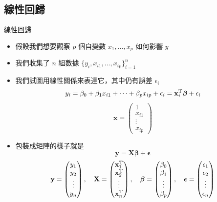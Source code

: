 \documentclass{beamer}
\begin{document}
\begin{CJK}{UTF8}{bsmi}
\subsection{線性回歸}
\begin{frame}[allowframebreaks]{線性回歸}
  \begin{itemize}
    \item 假設我們想要觀察 $p$ 個自變數 $x_1, \dots, x_p$ 如何影響 $y$
    \item 我們收集了 $n$ 組數據 $\{y_i, x_{i1}, \dots, x_{ip}\}_{i=1}^n$
    \item 我們試圖用線性關係來表達它，其中仍有誤差 $\epsilon_i$
      \[y_i = \beta_0 + \beta_1 x_{i1} + \cdots + \beta_p x_{ip} + \epsilon_i
	  = \mathbf x_i^{\textup T} \boldsymbol\beta + \epsilon_i\]
      \[\mathbf x = \begin{pmatrix} 1\\ x_{i1}\\ \vdots\\ x_{ip} \end{pmatrix}\]
    \item 包裝成矩陣的樣子就是
      \[\mathbf y = \mathbf X \boldsymbol\beta + \boldsymbol\epsilon\]
      \[\mathbf y = \begin{pmatrix} y_1\\ y_2\\ \vdots\\ y_n \end{pmatrix}, \quad
	\mathbf X = \begin{pmatrix} \mathbf x_1^{\textup T}\\ \mathbf x_2^{\textup T}\\ \vdots\\
	    \mathbf x_n^{\textup T} \end{pmatrix}, \quad
	\boldsymbol\beta = \begin{pmatrix} \beta_0\\ \beta_1\\ \vdots\\ \beta_p \end{pmatrix}, \quad
	\boldsymbol\epsilon = \begin{pmatrix} \epsilon_1\\ \epsilon_2\\ \vdots\\ \epsilon_n \end{pmatrix}\]
  \end{itemize}
\end{frame}


\end{CJK}
\end{document}
